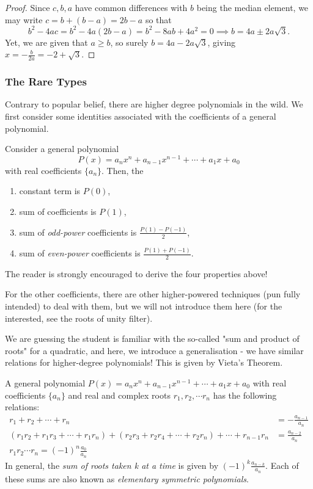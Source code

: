 \documentclass[../jarvis.tex]{subfiles}
\begin{document}
\begin{proof}
    Since $c,b,a$ have common differences with $b$ being the median element, we may write $c=b+(b-a)=2b-a$ so that 
$$b^2-4ac=b^2-4a(2b-a)=b^2-8ab+4a^2=0 \implies b=4a\pm2a\sqrt{3}.$$
Yet, we are given that $a\geq b$, so surely $b=4a-2a\sqrt{3}$, giving $x=-\frac{b}{2a}=\boxed{-2+\sqrt{3}}.$
\end{proof}

\subsubsection{The Rare Types}
Contrary to popular belief, there are higher degree polynomials in the wild. We first consider some identities associated with the coefficients of a general polynomial.

Consider a general polynomial $$P(x)=a_nx^n+a_{n-1}x^{n-1}+\cdots+a_1x+a_0$$ with real coefficients $\{a_n\}$. Then, the
\begin{enumerate}
    \item constant term is $P(0)$,
    \item sum of coefficients is $P(1)$,
    \item sum of \textit{odd-power} coefficients is $\frac{P(1)-P(-1)}{2}$,
    \item sum of \textit{even-power} coefficients is $\frac{P(1)+P(-1)}{2}$.
\end{enumerate}

The reader is strongly encouraged to derive the four properties above!

For the other coefficients, there are other higher-powered techniques (pun fully intended) to deal with them, but we will not introduce them here (for the interested, see the roots of unity filter).

We are guessing the student is familiar with the so-called "sum and product of roots" for a quadratic, and here, we introduce a generalisation - we have similar relations for higher-degree polynomials! This is given by Vieta's Theorem.

\begin{proposition}
    A general polynomial $P(x)=a_nx^n+a_{n-1}x^{n-1}+\cdots+a_1x+a_0$ with real coefficients $\{a_n\}$ and real and complex roots $r_1, r_2, \cdots r_n$ has the following relations:
    \begin{align*}
        r_1+r_2+\cdots+r_n&=-\frac{a_{n-1}}{a_n}\\
        (r_1r_2+r_1r_3+\cdots+r_1r_n)+(r_2r_3+r_2r_4+\cdots+r_2r_n)+\cdots+r_{n-1}r_n&=\frac{a_{n-2}}{a_n} \\
        r_1r_2\cdots r_n=(-1)^n\frac{a_0}{a_n}
    \end{align*}
    In general, the \textit{sum of roots taken k at a time} is given by $(-1)^k\frac{a_{n-k}}{a_n}.$ Each of these sums are also known as \textit{elementary symmetric polynomials}.
\end{proposition}
\end{document}

